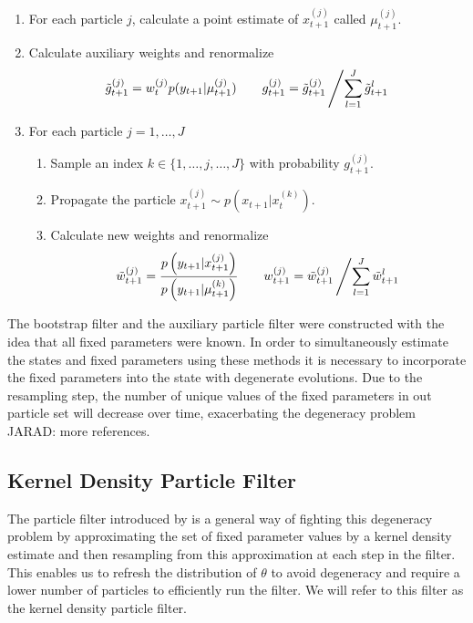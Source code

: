 \documentclass{article}
\newcommand{\jarad}[1]{{\color{red}JARAD: #1}}
\begin{document}
\begin{enumerate}
\item For each particle $j$, calculate a point estimate of $x_{t+1}^{(j)}$ called $\mu_{t+1}^{(j)}$.  %
\item Calculate auxiliary weights and renormalize
\[ \tilde{g}_{t+1}^{(j)} = w_t^{(j)} p(y_{t+1}|\mu_{t+1}^{(j)}) \qquad g_{t+1}^{(j)} = \tilde{g}_{t+1}^{(j)}\left/\sum_{l=1}^J \tilde{g}_{t+1}^l\right. \]
\item For each particle $j=1,\ldots,J$
	\begin{enumerate}
	\item Sample an index $k\in\{1,\ldots,j,\ldots,J\}$ with probability $g_{t+1}^{(j)}$.
	\item Propagate the particle $x_{t+1}^{(j)}\sim p\left(x_{t+1}|x_t^{(k)}\right)$.
	\item Calculate new weights and renormalize
\[\tilde{w}_{t+1}^{(j)} = \frac{p\left(y_{t+1}|x_{t+1}^{(j)}\right)}{p\left(y_{t+1}|\mu_{t+1}^{(k)}\right)} \qquad w_{t+1}^{(j)} = \tilde{w}_{t+1}^{(j)}\left/\sum_{l=1}^J \tilde{w}_{t+1}^l \right.\]
	\end{enumerate}
\end{enumerate}

The bootstrap filter and the auxiliary particle filter were constructed with the idea that all fixed parameters were known. In order to simultaneously estimate the states and fixed parameters using these methods it is necessary to incorporate the fixed parameters into the state with degenerate evolutions. Due to the resampling step, the number of unique values of the fixed parameters in out particle set will decrease over time, exacerbating the degeneracy problem \citep{Liu:West:comb:2001} \jarad{more references}.

\subsection{Kernel Density Particle Filter}

The particle filter introduced by \cite{Liu:West:comb:2001} is a general way of fighting this degeneracy problem by approximating the set of fixed parameter values by a kernel density estimate and then resampling from this approximation at each step in the filter. This enables us to refresh the distribution of $\theta$ to avoid degeneracy and require a lower number of particles to efficiently run the filter. We will refer to this filter as the kernel density particle filter.
\end{document}
